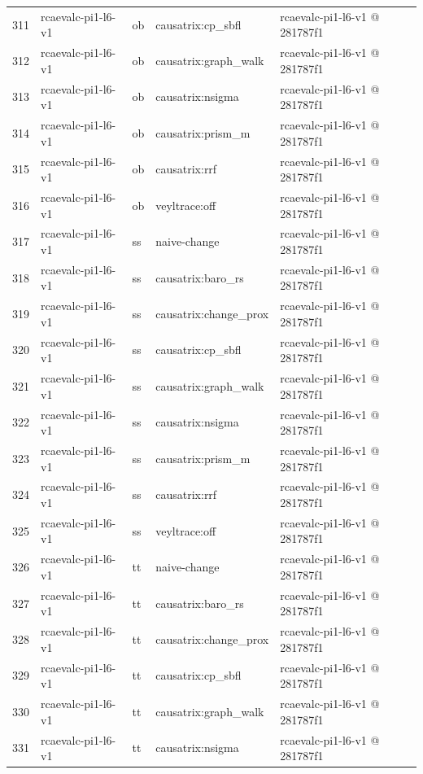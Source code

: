 \begin{longtable}{@{}r>{\raggedright\arraybackslash}p{87.0pt}>{\raggedright\arraybackslash}p{18.0pt}>{\raggedright\arraybackslash}p{63.0pt}>{\raggedright\arraybackslash}p{108.0pt}@{}}
311 & rcaevalc-pi1-l6-v1 & ob & causatrix:cp\_sbfl & rcaevalc-pi1-l6-v1 @ 281787f1 \\
312 & rcaevalc-pi1-l6-v1 & ob & causatrix:graph\_walk & rcaevalc-pi1-l6-v1 @ 281787f1 \\
313 & rcaevalc-pi1-l6-v1 & ob & causatrix:nsigma & rcaevalc-pi1-l6-v1 @ 281787f1 \\
314 & rcaevalc-pi1-l6-v1 & ob & causatrix:prism\_m & rcaevalc-pi1-l6-v1 @ 281787f1 \\
315 & rcaevalc-pi1-l6-v1 & ob & causatrix:rrf & rcaevalc-pi1-l6-v1 @ 281787f1 \\
316 & rcaevalc-pi1-l6-v1 & ob & veyltrace:off & rcaevalc-pi1-l6-v1 @ 281787f1 \\
317 & rcaevalc-pi1-l6-v1 & ss & naive-change & rcaevalc-pi1-l6-v1 @ 281787f1 \\
318 & rcaevalc-pi1-l6-v1 & ss & causatrix:baro\_rs & rcaevalc-pi1-l6-v1 @ 281787f1 \\
319 & rcaevalc-pi1-l6-v1 & ss & causatrix:change\_prox & rcaevalc-pi1-l6-v1 @ 281787f1 \\
320 & rcaevalc-pi1-l6-v1 & ss & causatrix:cp\_sbfl & rcaevalc-pi1-l6-v1 @ 281787f1 \\
321 & rcaevalc-pi1-l6-v1 & ss & causatrix:graph\_walk & rcaevalc-pi1-l6-v1 @ 281787f1 \\
322 & rcaevalc-pi1-l6-v1 & ss & causatrix:nsigma & rcaevalc-pi1-l6-v1 @ 281787f1 \\
323 & rcaevalc-pi1-l6-v1 & ss & causatrix:prism\_m & rcaevalc-pi1-l6-v1 @ 281787f1 \\
324 & rcaevalc-pi1-l6-v1 & ss & causatrix:rrf & rcaevalc-pi1-l6-v1 @ 281787f1 \\
325 & rcaevalc-pi1-l6-v1 & ss & veyltrace:off & rcaevalc-pi1-l6-v1 @ 281787f1 \\
326 & rcaevalc-pi1-l6-v1 & tt & naive-change & rcaevalc-pi1-l6-v1 @ 281787f1 \\
327 & rcaevalc-pi1-l6-v1 & tt & causatrix:baro\_rs & rcaevalc-pi1-l6-v1 @ 281787f1 \\
328 & rcaevalc-pi1-l6-v1 & tt & causatrix:change\_prox & rcaevalc-pi1-l6-v1 @ 281787f1 \\
329 & rcaevalc-pi1-l6-v1 & tt & causatrix:cp\_sbfl & rcaevalc-pi1-l6-v1 @ 281787f1 \\
330 & rcaevalc-pi1-l6-v1 & tt & causatrix:graph\_walk & rcaevalc-pi1-l6-v1 @ 281787f1 \\
331 & rcaevalc-pi1-l6-v1 & tt & causatrix:nsigma & rcaevalc-pi1-l6-v1 @ 281787f1 \\

\end{longtable}
